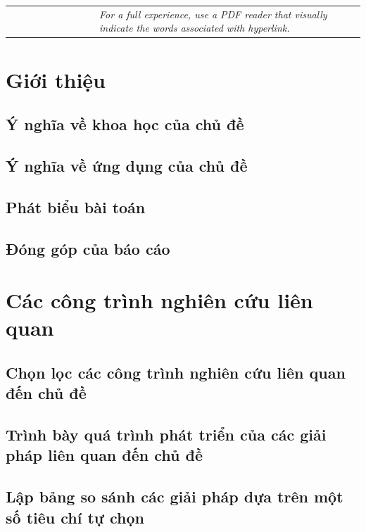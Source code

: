 \documentclass[12pt, a4paper]{extarticle}
\begin{document}
    \pagebreak



    \begin{tabular}{p{0.25\linewidth} p{0.75\linewidth}}
        & \emph{For a full experience, use a PDF reader that visually indicate the words associated with hyperlink.}\\
    \end{tabular}
    \tableofcontents
    \pagebreak

    \section{Giới thiệu}
        \subsection{Ý nghĩa về khoa học của chủ đề}
        \subsection{Ý nghĩa về ứng dụng của chủ đề}
        \subsection{Phát biểu bài toán}
        \subsection{Đóng góp của báo cáo}

    \section{Các công trình nghiên cứu liên quan}
        \subsection{Chọn lọc các công trình nghiên cứu liên quan đến chủ đề}
        \subsection{Trình bày quá trình phát triển của các giải pháp liên quan đến chủ đề}
        \subsection{Lập bảng so sánh các giải pháp dựa trên một số tiêu chí tự chọn}
\end{document}
